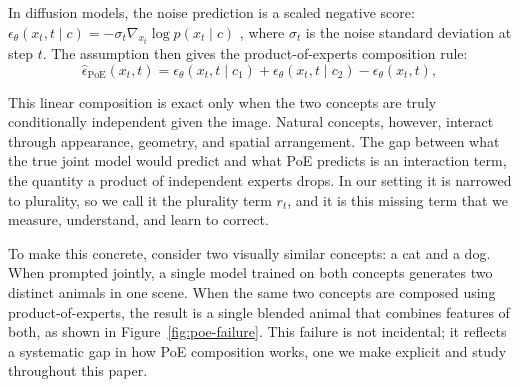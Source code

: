 \documentclass{article} %
\begin{document}

In diffusion models, the noise prediction is a scaled negative score: $\epsilon_\theta(x_t, t \mid c) = -\sigma_t \nabla_{x_t} \log p(x_t \mid c)$ \citep{dhariwal2021diffusion}, where $\sigma_t$ is the noise standard deviation at step $t$. The assumption then gives the product-of-experts composition rule:
\begin{equation}
\hat\epsilon_{\mathrm{PoE}}(x_t,t) = \epsilon_\theta(x_t,t\mid c_1) + \epsilon_\theta(x_t,t\mid c_2) - \epsilon_\theta(x_t,t),
\label{eq:poe-composition}
\end{equation}

This linear composition is exact only when the two concepts are truly conditionally independent given the image. Natural concepts, however, interact through appearance, geometry, and spatial arrangement. The gap between what the true joint model would predict and what PoE predicts is an interaction term, the quantity a product of independent experts drops. In our setting it is narrowed to plurality, so we call it the plurality term $r_t$, and it is this missing term that we measure, understand, and learn to correct.

To make this concrete, consider two visually similar concepts: a cat and a dog. When prompted jointly, a single model trained on both concepts generates two distinct animals in one scene. When the same two concepts are composed using product-of-experts, the result is a single blended animal that combines features of both, as shown in Figure~\ref{fig:poe-failure}. This failure is not incidental; it reflects a systematic gap in how PoE composition works, one we make explicit and study throughout this paper.
\end{document}
